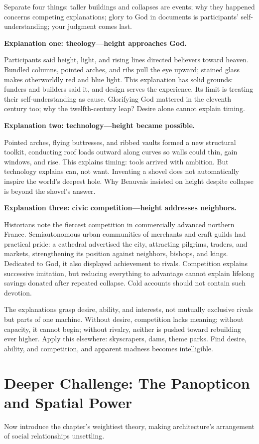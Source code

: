 Separate four things: taller buildings and collapses are events; why they happened concerns competing explanations; glory to God in documents is participants' self-understanding; your judgment comes last.

\textbf{Explanation one: theology---height approaches God.}

Participants said height, light, and rising lines directed believers toward heaven. Bundled columns, pointed arches, and ribs pull the eye upward; stained glass makes otherworldly red and blue light. This explanation has solid grounds: funders and builders said it, and design serves the experience. Its limit is treating their self-understanding as cause. Glorifying God mattered in the eleventh century too; why the twelfth-century leap? Desire alone cannot explain timing.

\textbf{Explanation two: technology---height became possible.}

Pointed arches, flying buttresses, and ribbed vaults formed a new structural toolkit, conducting roof loads outward along curves so walls could thin, gain windows, and rise. This explains timing: tools arrived with ambition. But technology explains can, not want. Inventing a shovel does not automatically inspire the world's deepest hole. Why Beauvais insisted on height despite collapse is beyond the shovel's answer.

\textbf{Explanation three: civic competition---height addresses neighbors.}

Historians note the fiercest competition in commercially advanced northern France. Semiautonomous urban communities of merchants and craft guilds had practical pride: a cathedral advertised the city, attracting pilgrims, traders, and markets, strengthening its position against neighbors, bishops, and kings. Dedicated to God, it also displayed achievement to rivals. Competition explains successive imitation, but reducing everything to advantage cannot explain lifelong savings donated after repeated collapse. Cold accounts should not contain such devotion.

The explanations grasp desire, ability, and interests, not mutually exclusive rivals but parts of one machine. Without desire, competition lacks meaning; without capacity, it cannot begin; without rivalry, neither is pushed toward rebuilding ever higher. Apply this elsewhere: skyscrapers, dams, theme parks. Find desire, ability, and competition, and apparent madness becomes intelligible.

\section[The Panopticon and Spatial Power]{Deeper Challenge: The Panopticon and Spatial Power}
Now introduce the chapter's weightiest theory, making architecture's arrangement of social relationships unsettling.

